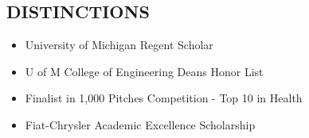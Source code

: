 \documentclass[line,margin]{res}
\begin{document}
\begin{resume}
\section{\textcolor{HeaderColor}{DISTINCTIONS}}
    \begin{itemize} \itemsep-0.2em
    \item University of Michigan Regent Scholar
    \item U of M College of Engineering Dean\textquotesingle s Honor List
    \item Finalist in 1,000 Pitches Competition - Top 10 in Health
    \item Fiat-Chrysler Academic Excellence Scholarship
    \end{itemize}
 

\end{resume}
\end{document}
